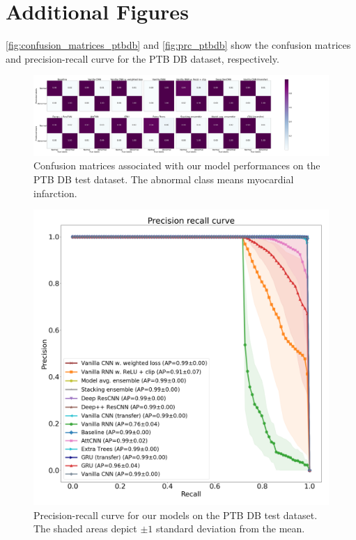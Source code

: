 \appendix

\section{Additional Figures}
\autoref{fig:confusion_matrices_ptbdb} and \autoref{fig:prc_ptbdb} show the confusion matrices and precision-recall curve for the PTB DB dataset, respectively. 

\begin{figure}[b]
    \centering
    \includegraphics[width=1\linewidth]{figures/confusion_matrices_ptbdb.png}
    \caption{Confusion matrices associated with our model performances on the PTB DB test dataset. The abnormal class means myocardial infarction.}
    \label{fig:confusion_matrices_ptbdb}
\end{figure}

\begin{figure}[H]
    \centering
    \includegraphics[width=0.8\linewidth]{figures/prc_ptbdb.png}
    \caption{Precision-recall curve for our models on the PTB DB test dataset. The shaded areas depict \boldmath$\pm 1$ standard deviation from the mean.}
    \label{fig:prc_ptbdb}
\end{figure}

